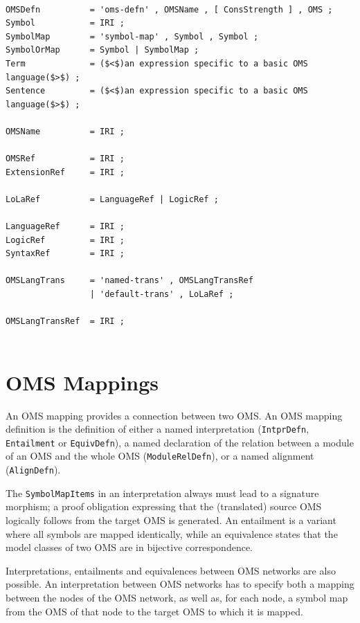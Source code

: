 \documentclass[10pt,fleqn,%
\ifpretendfinal
final%
\else
draft%
\fi,
]{scrreprt}
\newcommand{\red}[1]{#1} %
\newcommand*{\termref}[1]{\index{#1}#1\xspace}
\newcommand*{\syntax}[1]{\texttt{#1}}
\newcommand{\sclause}[1]{\section{#1}}
\begin{document}
\begin{lstlisting}[language=ebnf,escapeinside={()}]  % abstract syntax

OMSDefn          = 'oms-defn' , OMSName , [ ConsStrength ] , OMS ;
Symbol           = IRI ;
SymbolMap        = 'symbol-map' , Symbol , Symbol ;
SymbolOrMap      = Symbol | SymbolMap ;
Term             = ($<$)an expression specific to a basic OMS language($>$) ;
Sentence         = ($<$)an expression specific to a basic OMS language($>$) ;
                 
OMSName          = IRI ;
                 
OMSRef           = IRI ;
ExtensionRef     = IRI ;
                 
LoLaRef          = LanguageRef | LogicRef ;
                 
LanguageRef      = IRI ;
LogicRef         = IRI ;
SyntaxRef        = IRI ;
                 
OMSLangTrans     = 'named-trans' , OMSLangTransRef
                 | 'default-trans' , LoLaRef ; 
                 
OMSLangTransRef  = IRI ;
                 
\end{lstlisting}


\sclause{OMS Mappings}\label{c:oms-mappings}

An OMS mapping provides a connection between two OMS. An OMS mapping definition is the definition of 
either a named interpretation (\syntax{IntprDefn}, \red{\syntax{Entailment}} or 
\syntax{EquivDefn}), a named declaration of the  relation between a module of an OMS and the whole 
OMS (\syntax{ModuleRelDefn}), or a named \termref{alignment} (\syntax{AlignDefn}).

The \syntax{SymbolMapItems} in an interpretation always must lead to a signature morphism; a proof 
obligation expressing that the (translated) source OMS logically follows from the target OMS is 
generated.  \red{An entailment is a variant where all symbols are mapped identically, while an 
equivalence states that the model classes of two OMS are in bijective correspondence.}

\red{
Interpretations, entailments and equivalences between OMS networks are also possible. An 
interpretation between OMS networks has to specify both a mapping between the nodes of the OMS 
network, as well as, for each node, a symbol map from the OMS of that node to the target OMS to 
which it is mapped.
}
\end{document}
